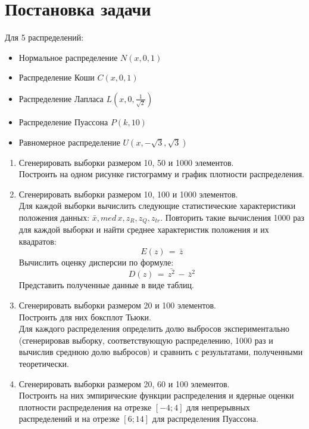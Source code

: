 \newpage
\section{Постановка задачи}

\begin{flushleft}
	Для 5 распределений:
	\begin{itemize}
		\item Нормальное распределение $ N(x, 0, 1) $
		\item Распределение Коши $ C(x, 0, 1) $
		\item Распределение Лапласа $ L(x, 0, \frac{1}{\sqrt{2}}) $
		\item Распределение Пуассона $ P(k, 10) $
		\item Равномерное распределение $ U(x, -\sqrt{3}, \sqrt{3}) $
	\end{itemize}
	\begin{enumerate}
		\item Сгенерировать выборки размером 10, 50 и 1000 элементов. \\ Построить на одном рисунке гистограмму и график плотности распределения.
		\item Сгенерировать выборки размером 10, 100 и 1000 элементов. \\ Для каждой выборки вычислить следующие статистические характеристики положения данных: $ \bar{x}, med\,x, z_{R}, z_{Q}, z_{tr} $. Повторить такие вычисления 1000 раз для каждой выборки и найти среднее характеристик положения и их квадратов:
		\begin{equation}
			\label{1} E(z)\,=\,\bar{z}
		\end{equation}
		Вычислить оценку дисперсии по формуле:
		\begin{equation}
			\label{2} D(z)\,=\,\bar{z^{2}}\,-\,\bar{z}^{2}
		\end{equation}
		Представить полученные данные в виде таблиц.
		\item Сгенерировать выборки размером 20 и 100 элементов. \\ Построить для них боксплот Тьюки. \\ Для каждого распределения определить долю выбросов экспериментально (сгенерировав выборку, соответствующую распределению, 1000 раз и вычислив среднюю долю выбросов) и сравнить с результатами, полученными теоретически.
		\item Сгенерировать выборки размером 20, 60 и 100 элементов. \\ Построить на них эмпирические функции распределения и ядерные оценки плотности распределения на отрезке $ [-4; 4] $ для непрерывных распределений и на отрезке $ [6; 14] $ для распределения Пуассона.
	\end{enumerate}
\end{flushleft}